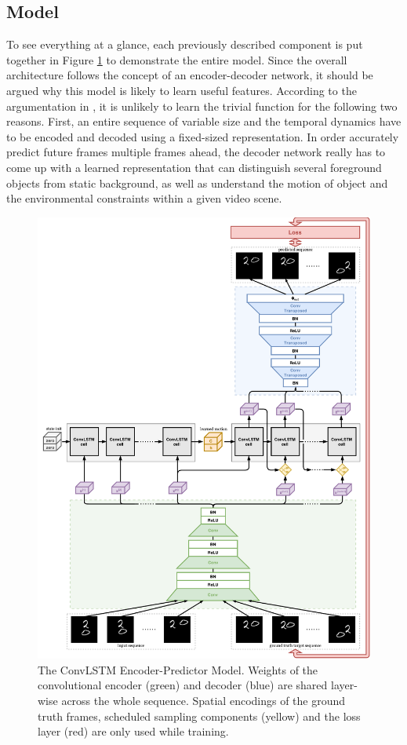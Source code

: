 \subsection{Model}

To see everything at a glance, each previously described component is put together in Figure \ref{fig:total_model} to demonstrate the entire model. Since the overall architecture follows the concept of an encoder-decoder network, it should be argued why this model is likely to learn useful features. According to the argumentation in \parencite[p. 3f.]{unsup_learn_lstm}, it is unlikely to learn the trivial function for the following two reasons. First, an entire sequence of variable size and the temporal dynamics have to be encoded and decoded using a fixed-sized representation. In order accurately predict future frames multiple frames ahead, the decoder network really has to come up with a learned representation that can distinguish several foreground objects from static background, as well as understand the motion of object and the environmental constraints within a given video scene.

\begin{figure}[p]
	\centering
	\includegraphics[width=0.96\linewidth]{figures/total_model.pdf}
	\caption[ConvLSTM Encoder-Predictor Model]{The ConvLSTM Encoder-Predictor Model. Weights of the convolutional encoder (green) and decoder (blue) are shared layer-wise across the whole sequence. Spatial encodings of the ground truth frames, scheduled sampling components (yellow) and the loss layer (red) are only used while training.} \label{fig:total_model}
\end{figure}

